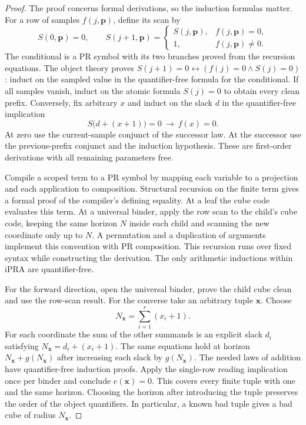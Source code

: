\begin{proof}
The proof concerns formal derivations, so the induction formulas matter.
For a row of samples \(f(j,\mathbf p)\), define its scan by
\[
 S(0,\mathbf p)=0,\qquad
 S(j+1,\mathbf p)=
 \begin{cases}
    S(j,\mathbf p),&f(j,\mathbf p)=0,\\
    1,&f(j,\mathbf p)\ne0 .
 \end{cases}
\]
The conditional is a PR symbol with its two branches proved from the
recursion equations. The object theory proves
\(S(j+1)=0\leftrightarrow(f(j)=0\land S(j)=0)\):
induct on the sampled value in the quantifier-free formula for the
conditional. If all samples vanish, induct on the atomic formula
\(S(j)=0\) to obtain every clean prefix. Conversely, fix arbitrary
\(x\) and induct on the slack \(d\) in the quantifier-free implication
\[
 S\bigl(d+(x+1)\bigr)=0\ \longrightarrow\ f(x)=0 .
\]
At zero use the current-sample conjunct of the successor law.
At the successor use the previous-prefix conjunct and the induction
hypothesis. These are first-order derivations with all remaining
parameters free.

Compile a scoped term to a PR symbol by mapping each variable to a
projection and each application to composition. Structural recursion on
the finite term gives a formal proof of the compiler's defining
equality. At a leaf the cube code evaluates this term. At a universal
binder, apply the row scan to the child's cube code, keeping the same
horizon \(N\) inside each child and scanning the new coordinate only
up to \(N\). A permutation and a duplication of arguments implement
this convention with PR composition. This recursion runs over fixed
syntax while constructing the derivation. The only arithmetic
inductions within iPRA are quantifier-free.

For the forward direction, open the universal binder, prove the child
cube clean and use the row-scan result. For the converse take an
arbitrary tuple \(\mathbf x\). Choose
\[
                   N_{\mathbf x}=\sum_{i=1}^r(x_i+1).
\]
For each coordinate the sum of the other summands is an explicit
slack \(d_i\) satisfying \(N_{\mathbf x}=d_i+(x_i+1)\).
The same equations hold at horizon \(N_{\mathbf x}+g(N_{\mathbf x})\)
after increasing each slack by \(g(N_{\mathbf x})\).
The needed laws of addition have quantifier-free induction proofs.
Apply the single-row reading implication once per binder and conclude
\(e(\mathbf x)=0\). This covers every finite tuple with one and the
same horizon. Choosing the horizon after introducing the tuple
preserves the order of the object quantifiers. In particular, a known
bad tuple gives a bad cube of radius \(N_{\mathbf x}\).


\end{proof}
